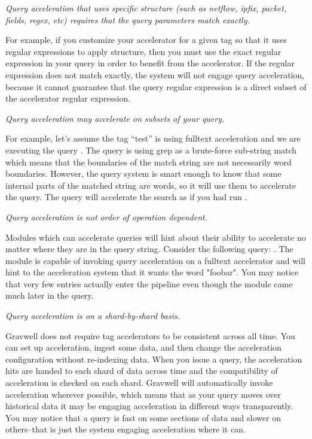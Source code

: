 {\textit{Query acceleration that uses specific structure (such as netflow, ipfix, packet, fields, regex, etc) requires that the query parameters match exactly.}

For example, if you customize your accelerator for a given tag so that it uses regular expressions to apply structure, then you must use the exact regular expression in your query in order to benefit from the accelerator.  If the regular expression does not match exactly, the system will not engage query acceleration, because it cannot guarantee that the query regular expression is a direct subset of the accelerator regular expression.

\textit{Query acceleration may accelerate on subsets of your query.}

For example, let's assume the tag ``test'' is using fulltext acceleration and we are executing the query .  The query is using grep as a brute-force sub-string match which means that the boundaries of the match string are not necessarily word boundaries.  However, the query system is smart enough to know that some internal parts of the matched string are words, so it will use them to accelerate the query.  The query will accelerate the search as if you had run .

\textit{Query acceleration is not order of operation dependent.}

Modules which can accelerate queries will hint about their ability to accelerate no matter where they are in the query string.  Consider the following query: .  The  module is capable of invoking query acceleration on a fulltext accelerator and will hint to the acceleration system that it wants the word "foobar".  You may notice that very few entries actually enter the pipeline even though the  module came much later in the query.

\textit{Query acceleration is on a shard-by-shard basis.}

Gravwell does not require tag accelerators to be consistent across all time. You can set up acceleration, ingest some data, and then change the acceleration configuration without re-indexing data.  When you issue a query, the acceleration hits are handed to each shard of data across time and the compatibility of acceleration is checked on each shard.  Gravwell will automatically invoke acceleration wherever possible, which means that as your query moves over historical data it may be engaging acceleration in different ways transparently.  You may notice that a query is fast on some sections of data and slower on others--that is just the system engaging acceleration where it can.

}
